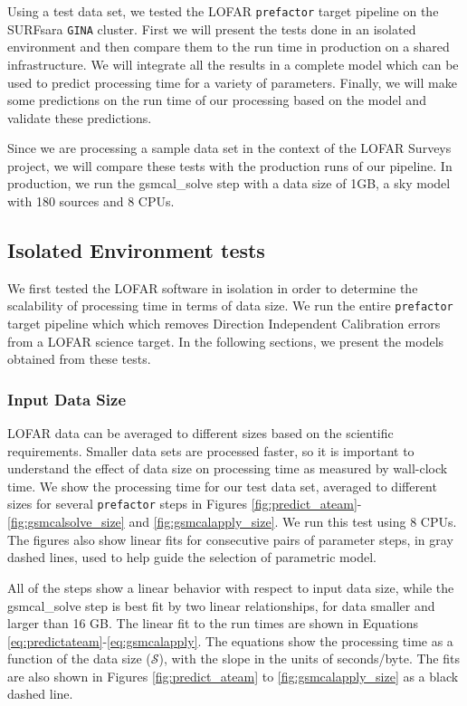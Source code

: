 
Using a test data set, we tested the LOFAR \texttt{prefactor} target pipeline on the SURFsara \texttt{GINA} cluster. First we will present the tests done in an isolated environment and then compare them to the run time in production on a shared infrastructure. We will integrate all the results in a complete model which can be used to predict processing time for a variety of parameters. Finally, we will make some predictions on the run time of our processing based on the model and validate these predictions. 

Since we are  processing a sample data set in the context of the LOFAR Surveys project, we will compare these tests with the production runs of our pipeline. In production, we run  the {\selectfont gsmcal\_solve} step with a data size of 1GB, a sky model with 180 sources and 8 CPUs. 
 

\subsection{Isolated Environment tests}
We first tested the LOFAR software in isolation in order to determine the scalability of processing time in terms of data size. We run the entire \texttt{prefactor} target pipeline which which removes Direction Independent Calibration errors from a LOFAR science target. In the following sections, we present the models obtained from these tests.  

\subsubsection{Input Data Size}\label{sec:results_size}
LOFAR data can be averaged to different sizes based on the scientific requirements. Smaller data sets are processed faster, so it is important to understand the effect of data size on processing time as measured by wall-clock time. We show the processing time for our test data set, averaged to different sizes for several \texttt{prefactor} steps in Figures \ref{fig:predict_ateam}- \ref{fig:gsmcalsolve_size} and \ref{fig:gsmcalapply_size}. We run this test using 8 CPUs. The figures also show linear fits for consecutive pairs of parameter steps, in gray dashed lines, used to help guide the selection of parametric model. 

All of the steps show a linear behavior with respect to input data size, while the {\selectfont gsmcal\_solve step} is best fit by two linear relationships, for data smaller and larger than 16 GB. The linear fit to the run times are shown in Equations \ref{eq:predictateam}-\ref{eq:gsmcalapply}. The equations show the processing time as a function of the data size ($\mathcal{S}$), with the slope in the units of seconds/byte. The fits are also shown in Figures \ref{fig:predict_ateam} to \ref{fig:gsmcalapply_size} as a black dashed line.

